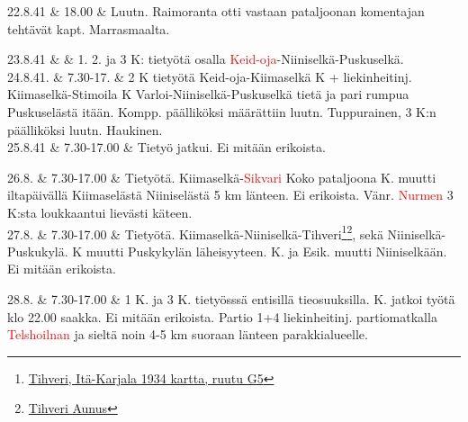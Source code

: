 \documentclass[11pt,a5paper,oneside]{book}
\begin{document}
22.8.41 & 18.00 & Luutn. Raimoranta otti vastaan pataljoonan komentajan tehtävät kapt. Marrasmaalta. \\
\newpage

23.8.41 & & 1. 2. ja 3 K: tietyötä osalla \textcolor{red}{Keid-oja}-Niiniselkä-Puskuselkä. \newline\newline \\

24.8.41. & 7.30-17. & 2 K tietyötä Keid-oja-Kiimaselkä  K + liekinheitinj. Kiimaselkä-Stimoila  K Varloi-Niiniselkä-Puskuselkä tietä ja pari rumpua Puskuselästä itään.  Kompp. päälliköksi määrättiin luutn. Tuppurainen, 3 K:n päälliköksi luutn. Haukinen. \newline \\

25.8.41 & 7.30-17.00 & Tietyö jatkui. Ei mitään erikoista. \\

\taulustop


26.8. & 7.30-17.00 & Tietyötä. Kiimaselkä-\textcolor{red}{Sikvari} \newline Koko pataljoona  K. muutti iltapäivällä Kiimaselästä Niiniselästä 5 km länteen. \newline Ei erikoista. Vänr. \textcolor{red}{Nurmen} 3 K:sta loukkaantui lievästi käteen. \newline\newline \\

27.8. & 7.30-17.00 & Tietyötä. Kiimaselkä-Niiniselkä-Tihveri\footnote{\href{https://www.google.fi/maps/place/61\%C2\%B020'14.6\%22N+32\%C2\%B052'39.7\%22E/@61.337376,32.8755083,903m/}{Tihveri, Itä-Karjala 1934 kartta, ruutu G5}}\footnote{\href{https://www.sotahistoriallisetkohteet.fi/app/sights/view/-/id/1175/country/9/area/90/s_back/1}{Tihveri Aunus}}, sekä Niiniselkä-Puskukylä.  K muutti Puskykylän läheisyyteen.  K. ja Esik. muutti Niiniselkään. \newline Ei mitään erikoista. \\
\newpage

28.8. & 7.30-17.00 & 1 K. ja 3 K. tietyösssä entisillä tieosuuksilla.  K. jatkoi työtä klo 22.00 saakka. Ei mitään erikoista. \newline Partio 1+4 liekinheitinj. partiomatkalla \textcolor{red}{Telshoilnan} ja sieltä noin 4-5 km suoraan länteen parakkialueelle. \newline\newline\newline \\
\end{document}
